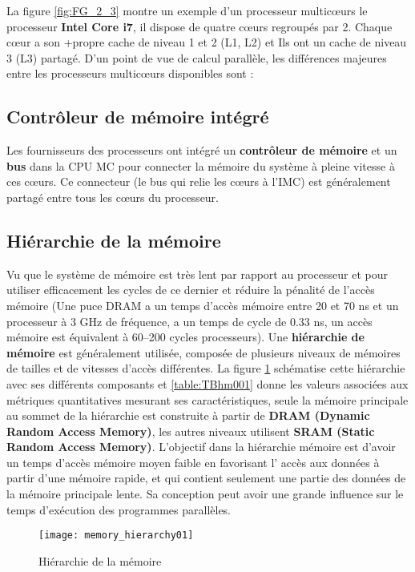 La figure \ref{fig:FG_2_3} montre un exemple d'un processeur multicœurs le processeur \textbf{Intel Core i7}, il dispose de quatre cœurs regroupés par 2. 
%
Chaque cœur a son +propre cache de niveau 1 et 2 (L1, L2) et
Ils ont un cache de niveau 3 (L3) partagé.
D’un point de vue de calcul parallèle, les différences majeures entre les processeurs multicœurs disponibles sont :
%
\subsection{Contrôleur de mémoire intégré}
%
Les fournisseurs des processeurs ont intégré un \textbf{contrôleur de mémoire} et un \textbf{bus} dans la CPU MC pour connecter la mémoire du système à pleine vitesse à ces cœurs. 
Ce connecteur (le bus qui relie les cœurs à l’IMC) est généralement partagé entre tous les cœurs du processeur. %
%
\subsection{Hiérarchie de la mémoire \cite{raub13}} 
%
Vu que le système de mémoire est très lent par rapport au processeur et pour utiliser efficacement les cycles de ce dernier et réduire la pénalité de l'accès mémoire (Une puce DRAM a un temps d'accès mémoire entre 20 et 70 ns 
et un processeur à 3 GHz de fréquence, a un temps de cycle de 0.33 ns, un accès mémoire est équivalent à 60–200 cycles processeurs).
Une \textbf{hiérarchie de mémoire} est généralement utilisée, composée de plusieurs niveaux de mémoires de tailles et de vitesses d'accès différentes. La figure \ref{fig:FG_2_4} schématise cette hiérarchie avec ses différents composants et \ref{table:TBhm001} donne les valeurs associées aux métriques quantitatives mesurant ses caractéristiques, seule la mémoire principale au sommet de la hiérarchie est construite à partir de \textbf{DRAM (Dynamic Random Access Memory)}, les autres niveaux utilisent \textbf{SRAM (Static Random Access Memory)}.
L'objectif dans la hiérarchie mémoire est d'avoir un temps d'accès mémoire moyen faible en favorisant l' accès aux données à partir d'une mémoire rapide, et qui contient seulement une partie des données de la mémoire principale lente. 
Sa conception peut avoir une grande influence sur le temps d'exécution des programmes parallèles.

\begin{figure}[h]
\texttt{[image: memory\_hierarchy01]}
\centering
\caption{Hiérarchie de la mémoire}
\label{fig:FG_2_4}
\end{figure} 

